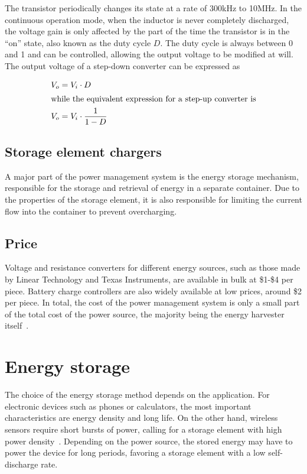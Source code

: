 \documentclass[a4paper,10pt]{article}
\begin{document}
The transistor periodically changes its state at a rate of 300kHz to 10MHz. In the continuous operation mode, when the inductor is never completely discharged, the voltage gain is only affected by the part of the time the transistor is in the ``on'' state, also known as the duty cycle $D$. The duty cycle is always between 0 and 1 and can be controlled, allowing the output voltage to be modified at will. The output voltage of a step-down converter can be expressed as

\begin{align}
  V_o &= V_i \cdot D \\
\intertext{while the equivalent expression for a step-up converter is}
  V_o &= V_i \cdot \frac{1}{1-D}
\end{align}


\subsection{Storage element chargers}

A major part of the power management system is the energy storage mechanism, responsible for the storage and retrieval of energy in a separate container. Due to the properties of the storage element, it is also responsible for limiting the current flow into the container to prevent overcharging. 

\subsection{Price}

Voltage and resistance converters for different energy sources, such as those made by Linear Technology and Texas Instruments, are available in bulk at \$1-\$4 per piece. Battery charge controllers are also widely available at low prices, around \$2 per piece. In total, the cost of the power management system is only a small part of the total cost of the power source, the majority being the energy harvester itself~\cite{lt:cenik, ti:eh}. 

\section{Energy storage}

The choice of the energy storage method depends on the application. For electronic devices such as phones or calculators, the most important characteristics are energy density and long life. On the other hand, wireless sensors require short bursts of power, calling for a storage element with high power density~\cite{cap-wsn-ieee}. Depending on the power source, the stored energy may have to power the device for long periods, favoring a storage element with a low self-discharge rate. 
\end{document}

